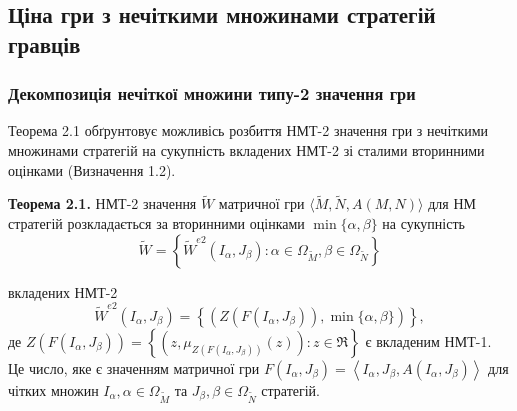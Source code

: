 \documentclass[14pt, a4paper, oneside]{extarticle}
\numberwithin{equation}{section}
\begin{document}
\subsection{Ціна гри з нечіткими множинами стратегій гравців}
\subsubsection{Декомпозиція нечіткої множини типу-2 значення гри}
Теорема 2.1 обґрунтовує можливісь розбиття НМТ-2 значення гри з нечіткими множинами стратегій на сукупність вкладених НМТ-2 зі сталими вторинними оцінками (Визначення 1.2).

\textbf{Теорема 2.1.} НМТ-2 значення $\tilde{W}$ матричної гри $\langle\tilde{M}, \tilde{N}, A(M, N)\rangle$ для НМ стратегій розкладається за вторинними оцінками $\min \{\alpha, \beta\}$ на сукупність
\begin{equation*}
\tilde{W}=\left\{\tilde{W}^{e 2}\left(I_{\alpha}, J_{\beta}\right): \alpha \in \Omega_{\tilde{M}}, \beta \in \Omega_{\tilde{N}}\right\}
\end{equation*}

вкладених НМТ-2
\begin{equation*}
\tilde{W}^{e 2}\left(I_{\alpha}, J_{\beta}\right)=\left\{\left(Z\left(F\left(I_{\alpha}, J_{\beta}\right)\right), \min \{\alpha, \beta\}\right)\right\},
\end{equation*}
де $Z\left(F\left(I_{\alpha}, J_{\beta}\right)\right)=\left\{\left(z, \mu_{Z\left(F\left(I_{\alpha}, J_{\beta}\right)\right)}(z)\right): z \in \Re\right\}$ є вкладеним НМТ-1. Це число, яке є значенням матричної гри $F\left(I_{\alpha}, J_{\beta}\right)=\left\langle I_{\alpha}, J_{\beta}, A\left(I_{\alpha}, J_{\beta}\right)\right\rangle$ для чітких множин $I_{\alpha}, \alpha \in \Omega_{\tilde{M}}$ та $J_{\beta}, \beta \in \Omega_{\tilde{N}}$ стратегій.
\end{document}
